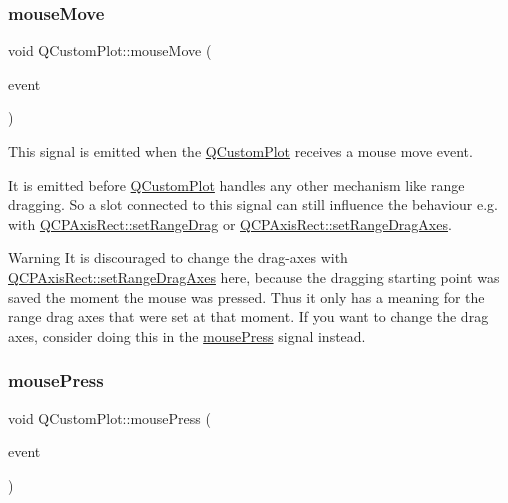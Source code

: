 \subsubsection{\texorpdfstring{mouse\+Move}{mouseMove}}
{\footnotesize\ttfamily void Q\+Custom\+Plot\+::mouse\+Move (\begin{DoxyParamCaption}\item[{Q\+Mouse\+Event $\ast$}]{event }\end{DoxyParamCaption})\hspace{0.3cm}{\ttfamily [signal]}}

This signal is emitted when the \mbox{\hyperlink{class_q_custom_plot}{Q\+Custom\+Plot}} receives a mouse move event.

It is emitted before \mbox{\hyperlink{class_q_custom_plot}{Q\+Custom\+Plot}} handles any other mechanism like range dragging. So a slot connected to this signal can still influence the behaviour e.\+g. with \mbox{\hyperlink{class_q_c_p_axis_rect_ae6aef2f7211ba6097c925dcd26008418}{Q\+C\+P\+Axis\+Rect\+::set\+Range\+Drag}} or \mbox{\hyperlink{class_q_c_p_axis_rect_a648cce336bd99daac4a5ca3e5743775d}{Q\+C\+P\+Axis\+Rect\+::set\+Range\+Drag\+Axes}}.

\begin{DoxyWarning}{Warning}
It is discouraged to change the drag-\/axes with \mbox{\hyperlink{class_q_c_p_axis_rect_a648cce336bd99daac4a5ca3e5743775d}{Q\+C\+P\+Axis\+Rect\+::set\+Range\+Drag\+Axes}} here, because the dragging starting point was saved the moment the mouse was pressed. Thus it only has a meaning for the range drag axes that were set at that moment. If you want to change the drag axes, consider doing this in the \mbox{\hyperlink{class_q_custom_plot_aca75bf9afb5dd19349c375de2a87a051}{mouse\+Press}} signal instead. 
\end{DoxyWarning}
\mbox{\label{class_q_custom_plot_aca75bf9afb5dd19349c375de2a87a051}} 
\subsubsection{\texorpdfstring{mouse\+Press}{mousePress}}
{\footnotesize\ttfamily void Q\+Custom\+Plot\+::mouse\+Press (\begin{DoxyParamCaption}\item[{Q\+Mouse\+Event $\ast$}]{event }\end{DoxyParamCaption})\hspace{0.3cm}{\ttfamily [signal]}}

